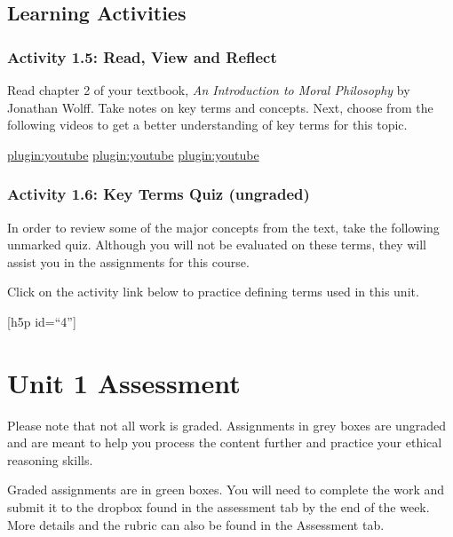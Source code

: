 \documentclass[
]{book}
\begin{document}
\hypertarget{learning-activities-6}{%
\subsection{Learning Activities}\label{learning-activities-6}}

\hypertarget{activity-1.5-read-view-and-reflect-1}{%
\subsubsection{Activity 1.5: Read, View and Reflect}\label{activity-1.5-read-view-and-reflect-1}}

Read chapter 2 of your textbook, \emph{An Introduction to Moral Philosophy} by
Jonathan Wolff. Take notes on key terms and concepts.
Next, choose from the following videos to get a better understanding of key
terms for this topic.

\href{https://www.youtube.com/watch?v=Z11v2nWsgGA}{plugin:youtube}
\href{https://www.youtube.com/watch?v=DxhsYTlBNG8}{plugin:youtube}
\href{https://www.youtube.com/watch?v=asery3UeBj4}{plugin:youtube}

\hypertarget{activity-1.6-key-terms-quiz-ungraded-1}{%
\subsubsection{Activity 1.6: Key Terms Quiz (ungraded)}\label{activity-1.6-key-terms-quiz-ungraded-1}}

In order to review some of the major concepts from the text, take the following unmarked quiz. Although you will not be evaluated on these terms, they will assist you in the assignments for this course.

Click on the activity link below to practice defining terms used in this unit.

{[}h5p id=``4''{]}

\hypertarget{unit-1-assessment-1}{%
\section{Unit 1 Assessment}\label{unit-1-assessment-1}}

Please note that not all work is graded. Assignments in grey boxes are ungraded and are meant to help you process the content further and practice your ethical reasoning skills.

Graded assignments are in green boxes. You will need to complete the work and submit it to the dropbox found in the assessment tab by the end of the week. More details and the rubric can also be found in the Assessment tab.
\end{document}
